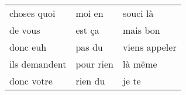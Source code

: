 \begin{table}[]
\begin{tabular}{|l|l|l|}
 choses quoi 	&moi en 	&souci là \\
 de vous 	&est ça 	&mais bon \\
donc euh 	&pas du 	& viens appeler \\
 ils demandent 	& pour rien 	& là même \\
donc votre 	& rien du 	& je te \\

\end{tabular}
\end{table}
